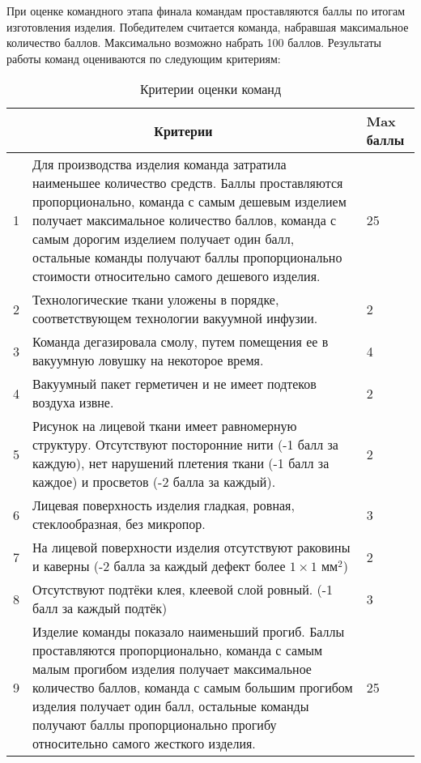При оценке командного этапа финала командам проставляются баллы по итогам изготовления изделия. Победителем считается команда, набравшая максимальное количество баллов. Максимально возможно набрать 100 баллов.
Результаты работы команд оцениваются по следующим критериям:
\begin{table}[H]
    \caption{Критерии оценки команд}
    \begin{center}
        \begin{tabular}{|p{0.3cm}|p{13cm}|p{1.3cm}|}
        \hline
        \multicolumn{2}{|c|}{Критерии} & Max баллы \\
        \hline
        1 & Для производства изделия команда затратила наименьшее количество средств. Баллы проставляются пропорционально, команда с самым дешевым изделием получает максимальное количество баллов, команда с самым дорогим изделием получает один балл, остальные команды получают баллы пропорционально стоимости относительно самого дешевого изделия.	& 25 \\
        \hline
        2 & Технологические ткани уложены в порядке, соответствующем технологии вакуумной инфузии. & 2 \\
        \hline
        3 & Команда дегазировала смолу, путем помещения ее в вакуумную ловушку на некоторое время. & 4\\
        \hline
        4 & Вакуумный пакет герметичен и не имеет подтеков воздуха извне. & 2 \\
        \hline
        5 & Рисунок на лицевой ткани имеет равномерную структуру. Отсутствуют посторонние нити (-1 балл за каждую), нет нарушений плетения ткани (-1 балл за каждое) и просветов (-2 балла за каждый). & 2 \\
        \hline
        6 & Лицевая поверхность изделия гладкая, ровная, стеклообразная, без микропор. & 3 \\
        \hline
        7 & На лицевой поверхности изделия отсутствуют раковины и каверны (-2 балла за каждый дефект более $1 \times 1$ мм$^2$) & 2 \\
        \hline
        8 & Отсутствуют подтёки клея, клеевой слой ровный. (-1 балл за каждый подтёк) & 3\\
        \hline
        9 & Изделие команды показало наименьший прогиб. Баллы проставляются пропорционально, команда с самым малым прогибом изделия получает максимальное количество баллов, команда с самым большим прогибом изделия получает один балл, остальные команды получают баллы пропорционально прогибу относительно самого жесткого изделия. & 25 \\

\end{tabular}
\end{center}
\end{table}
